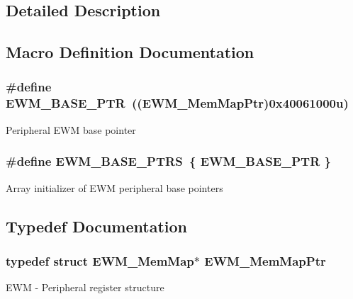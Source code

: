 \subsection{Detailed Description}


\subsection{Macro Definition Documentation}
\hypertarget{group___e_w_m___peripheral_gae3454b5b37183b746362498d1fafc40c}{}
\subsubsection[{E\+W\+M\+\_\+\+B\+A\+S\+E\+\_\+\+P\+T\+R}]{\setlength{\rightskip}{0pt plus 5cm}\#define E\+W\+M\+\_\+\+B\+A\+S\+E\+\_\+\+P\+T\+R~(({\bf E\+W\+M\+\_\+\+Mem\+Map\+Ptr})0x40061000u)}\label{group___e_w_m___peripheral_gae3454b5b37183b746362498d1fafc40c}
Peripheral E\+W\+M base pointer \hypertarget{group___e_w_m___peripheral_ga8b79ee9e363583bee6122ee3da7952b2}{}
\subsubsection[{E\+W\+M\+\_\+\+B\+A\+S\+E\+\_\+\+P\+T\+R\+S}]{\setlength{\rightskip}{0pt plus 5cm}\#define E\+W\+M\+\_\+\+B\+A\+S\+E\+\_\+\+P\+T\+R\+S~\{ {\bf E\+W\+M\+\_\+\+B\+A\+S\+E\+\_\+\+P\+T\+R} \}}\label{group___e_w_m___peripheral_ga8b79ee9e363583bee6122ee3da7952b2}
Array initializer of E\+W\+M peripheral base pointers 

\subsection{Typedef Documentation}
\hypertarget{group___e_w_m___peripheral_ga1de35bc04fc7fa4929507210147339a6}{}
\subsubsection[{E\+W\+M\+\_\+\+Mem\+Map\+Ptr}]{\setlength{\rightskip}{0pt plus 5cm}typedef struct {\bf E\+W\+M\+\_\+\+Mem\+Map}$\ast$ {\bf E\+W\+M\+\_\+\+Mem\+Map\+Ptr}}\label{group___e_w_m___peripheral_ga1de35bc04fc7fa4929507210147339a6}
E\+W\+M -\/ Peripheral register structure 